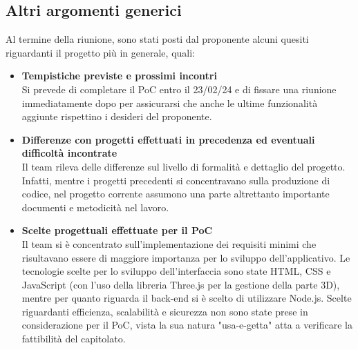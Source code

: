 \subsection{Altri argomenti generici} \label{sec:argomenti:altri}
    Al termine della riunione, sono stati posti dal proponente alcuni quesiti riguardanti il progetto più in generale, quali:
    \begin{itemize}
        \item \textbf{Tempistiche previste e prossimi incontri}\\
        Si prevede di completare il PoC entro il 23/02/24 e di fissare una riunione immediatamente dopo per assicurarsi che anche le ultime funzionalità aggiunte rispettino i desideri del proponente.
        \item \textbf{Differenze con progetti effettuati in precedenza ed eventuali difficoltà incontrate}\\
        Il team rileva delle differenze sul livello di formalità e dettaglio del progetto. Infatti, mentre i progetti precedenti si concentravano sulla produzione di codice, nel progetto corrente assumono una parte altrettanto importante documenti e metodicità nel lavoro.
        \item \textbf{Scelte progettuali effettuate per il PoC}\\
        Il team si è concentrato sull'implementazione dei requisiti minimi che risultavano essere di maggiore importanza per lo sviluppo dell'applicativo. Le tecnologie scelte per lo sviluppo dell'interfaccia sono state HTML, CSS e JavaScript (con l'uso della libreria Three.js per la gestione della parte 3D), mentre per quanto riguarda il back-end si è scelto di utilizzare Node.js. Scelte riguardanti efficienza, scalabilità e sicurezza non sono state prese in considerazione per il PoC, vista la sua natura "usa-e-getta" atta a verificare la fattibilità del capitolato.
    \end{itemize}
